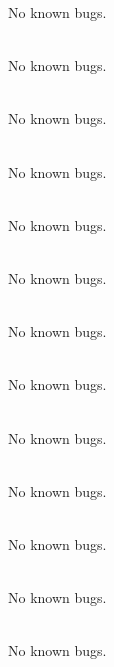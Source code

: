\begin{DoxyRefList}
No known bugs.  
\item[File \doxylink{_r__y_8hpp}{R\+\_\+y.hpp} ]\hfill \\
\label{bug__bug000036}%
%
No known bugs.  
\item[File \doxylink{_r__z_8cpp}{R\+\_\+z.cpp} ]\hfill \\
\label{bug__bug000081}%
%
No known bugs.  
\item[File \doxylink{_r__z_8hpp}{R\+\_\+z.hpp} ]\hfill \\
\label{bug__bug000037}%
%
No known bugs.  
\item[File \doxylink{rpoly_8cpp}{rpoly.cpp} ]\hfill \\
\label{bug__bug000082}%
%
No known bugs.  
\item[File \doxylink{rpoly_8hpp}{rpoly.hpp} ]\hfill \\
\label{bug__bug000038}%
%
No known bugs.  
\item[File \doxylink{_s_a_t___const_8hpp}{SAT\+\_\+\+Const.hpp} ]\hfill \\
\label{bug__bug000039}%
%
No known bugs.  
\item[File \doxylink{sign___8cpp}{sign\+\_\+.cpp} ]\hfill \\
\label{bug__bug000083}%
%
No known bugs.  
\item[File \doxylink{sign___8hpp}{sign\+\_\+.hpp} ]\hfill \\
\label{bug__bug000040}%
%
No known bugs.  
\item[File \doxylink{tests_8cpp}{tests.cpp} ]\hfill \\
\label{bug__bug000089}%
%
No known bugs.  
\item[File \doxylink{timediff_8cpp}{timediff.cpp} ]\hfill \\
\label{bug__bug000084}%
%
No known bugs.  
\item[File \doxylink{timediff_8hpp}{timediff.hpp} ]\hfill \\
\label{bug__bug000041}%
%
No known bugs.  
\item[File \doxylink{_time_update_8cpp}{Time\+Update.cpp} ]\hfill \\
\label{bug__bug000085}%
%
No known bugs.  
\item[File \doxylink{_time_update_8hpp}{Time\+Update.hpp} ]\hfill \\

\end{DoxyRefList}
